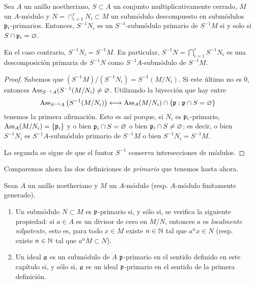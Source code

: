 \documentclass[../main.tex]{subfiles}
\begin{document}
\begin{proposition}
Sea $A$ un anillo noetheriano, $S\subset A$ un conjunto multiplicativamente cerrado, $M$ un $A$-módulo y $N=\cap_{i=1}^rN_i \subset M$  un submódulo descompuesto en submódulos $\mathfrak{p}_i$-primarios. Entonces, $S^{-1}N_i$ es un $S^{-1}$-submódulo primario de $S^{-1}M$ si y solo si $S\cap\mathfrak{p}_i=\varnothing$.

En el caso contrario, $S^{-1}N_i=S^{-1}M$. En particular, $S^{-1}N=\bigcap_{i=1}^rS^{-1}N_i$ es una descomposición primaria de $S^{-1}N$ como $S^{-1}A$-submódulo de $S^{-1}M.$
\end{proposition}
\begin{proof}
Sabemos que $(S^{-1}M) / (S^{-1}N_i)=S^{-1}(M /N_i)$. Si este último no es 0, entonces $\text{Ass}_{S^{-1}A}(S^{-1}(M /N_i)\neq\varnothing$. Utilizando la biyección que hay entre
$$\text{Ass}_{S^{-1}A}\left (S^{-1}(M /N_i) \right)\longleftrightarrow\text{Ass}_A(M/N_i)\cap\{\mathfrak{p}:\mathfrak{p}\cap S=\varnothing\}$$
tenemos la primera afirmación. Esto es así porque, si $N_i$ es $\mathfrak{p}_i$-primario, $\text{Ass}_A(M/N_i)=\{\mathfrak{p}_i\}$ y o bien $\mathfrak{p}_i\cap S=\varnothing$ o bien $\mathfrak{p}_i\cap S\neq\varnothing$; es decir, o bien $S^{-1}N_i$ es $S^{-1}A$-submódulo primario de $S^{-1}M$ o bien $S^{-1}N_i=S^{-1}M.$

La segunda se sigue de que el funtor $S^{-1}$ conserva intersecciones de módulos.
\end{proof}

Comparemos ahora las dos definiciones de \textit{primario} que tenemos hasta ahora.

\begin{proposition}
Sean $A$ un anillo noetheriano y $M$ un $A$-módulo (resp. $A$-módulo finitamente generado).
\begin{enumerate}
    \item Un submódulo $N\subset M$ es $\mathfrak{p}$-primario si, y sólo si, se verifica la siguiente propiedad: si $a\in A$ es un divisor de cero en $M/N$, entonces $a$ es \textit{localmente nilpotente}, esto es, para todo $x\in M$ existe $n\in\mathbb{N}$ tal que $a^nx\in N$ (resp. existe $n\in\mathbb{N}$ tal que $a^nM\subset N$).
    \item Un ideal $\mathfrak{a}$ es un submódulo de $A$ $\mathfrak{p}$-primario en el sentido definido en este capítulo si, y sólo si, $\mathfrak{a}$ es un ideal $\mathfrak{p}$-primario en el sentido de la primera definición.
\end{enumerate}
\end{proposition}
\end{document}
